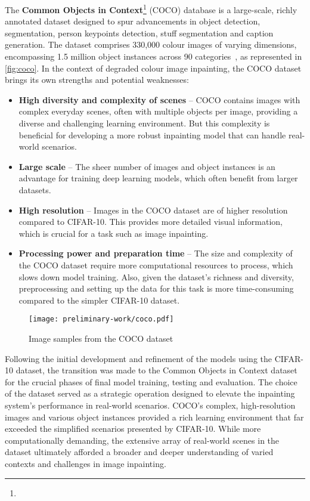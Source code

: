 
The \textbf{Common Objects in Context}\footnote{\coco} (COCO) database is a large-scale, richly annotated dataset designed to spur advancements in object detection, segmentation, person keypoints detection, stuff segmentation and caption generation. The dataset comprises 330,000 colour images of varying dimensions, encompassing 1.5 million object instances across 90 categories~\supercite{coco}, as represented in \autoref{fig:coco}. In the context of degraded colour image inpainting, the COCO dataset brings its own strengths and potential weaknesses:
\begin{itemize}[leftmargin=1.5em]
    \setlength\itemsep{0.2cm}

    \item \textbf{High diversity and complexity of scenes} -- COCO contains images with complex everyday scenes, often with multiple objects per image, providing a diverse and challenging learning environment. But this complexity is beneficial for developing a more robust inpainting model that can handle real-world scenarios.

    \item \textbf{Large scale} -- The sheer number of images and object instances is an advantage for training deep learning models, which often benefit from larger datasets.

    \item \textbf{High resolution} -- Images in the COCO dataset are of higher resolution compared to CIFAR-10. This provides more detailed visual information, which is crucial for a task such as image inpainting.

    \item \textbf{Processing power and preparation time} -- The size and complexity of the COCO dataset require more computational resources to process, which slows down model training. Also, given the dataset's richness and diversity, preprocessing and setting up the data for this task is more time-consuming compared to the simpler CIFAR-10 dataset.
\end{itemize}

\begin{figure}[ht]
    \centering
    \texttt{[image: preliminary-work/coco.pdf]}
    \caption{Image samples from the COCO dataset}
    \label{fig:coco}
\end{figure}

Following the initial development and refinement of the models using the CIFAR-10 dataset, the transition was made to the Common Objects in Context dataset for the crucial phases of final model training, testing and evaluation. The choice of the dataset served as a strategic operation designed to elevate the inpainting system's performance in real-world scenarios. COCO's complex, high-resolution images and various object instances provided a rich learning environment that far exceeded the simplified scenarios presented by CIFAR-10. While more computationally demanding, the extensive array of real-world scenes in the dataset ultimately afforded a broader and deeper understanding of varied contexts and challenges in image inpainting.

